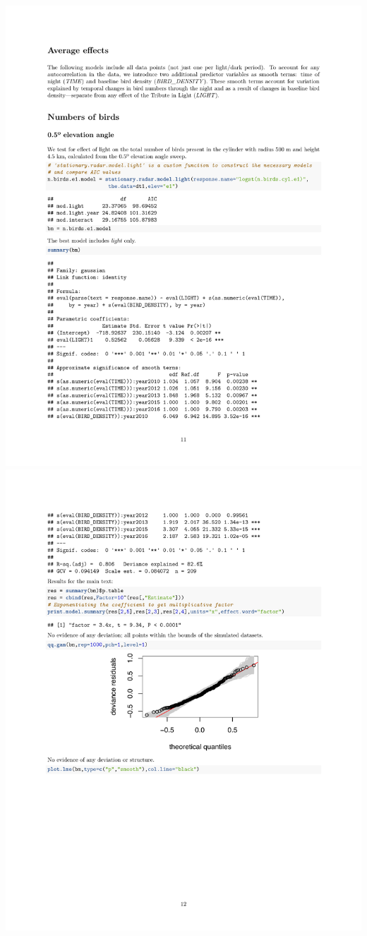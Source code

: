 \documentclass[a4paper, twoside]{templates/ociamthesis}
\begin{document}
\includegraphics[width=1\linewidth]{pdf_chapters/lights/lights_supp_crop_Part45}
\includegraphics[width=1\linewidth]{pdf_chapters/lights/lights_supp_crop_Part46}
\end{document}
